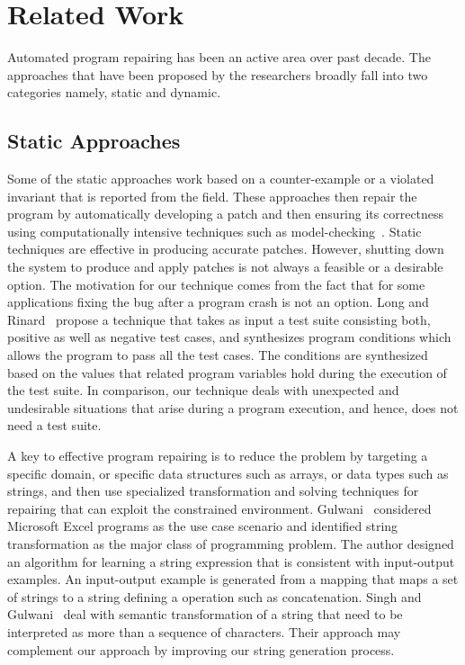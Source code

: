 \section{Related Work}
\label{sec:relatedWork}


Automated program repairing has been an active area over past decade. The
approaches that have been proposed by the researchers broadly fall into two
categories namely, static and dynamic.

\subsection{Static Approaches}

 Some of the static approaches work based on
a counter-example or a violated invariant that is reported from the field. These
approaches then repair the program by automatically developing a patch and then
ensuring its correctness using computationally intensive techniques such as
model-checking~\cite{biere2014, wei-issta-2010}. Static techniques are effective
in producing accurate patches. However, shutting down the system to produce and
apply patches is not always a feasible or a desirable option. The motivation for
our technique comes from the fact that for some applications fixing the bug
after a program crash is not an option. Long and Rinard~\cite{SPR} propose a
technique that takes as input a test suite consisting both, positive as well as negative test
cases, and synthesizes program conditions which allows the program to pass all
the test cases. The conditions are synthesized based on the values that related
program variables hold during the execution of the test suite. In comparison,
our technique deals with unexpected and undesirable situations that arise during
a program execution, and hence, does not need a test suite.

 A key to effective program repairing is to
reduce the problem by targeting a specific domain, or specific data structures
such as arrays, or data types such as strings, and then use specialized
transformation and solving techniques for repairing that can exploit the
constrained environment. Gulwani~\cite{Gulwani:2011} considered Microsoft Excel
programs as the use case scenario and identified string transformation as the
major class of programming problem. The author designed an algorithm for
learning a string expression that is consistent with input-output examples. An
input-output example is generated from a mapping that maps a set of strings to
a string defining a operation such as concatenation. Singh and
Gulwani~\cite{Singh:2012} deal with semantic transformation of a string that
need to be interpreted as more than a sequence of characters. Their approach may
complement our approach by improving our string generation process.

